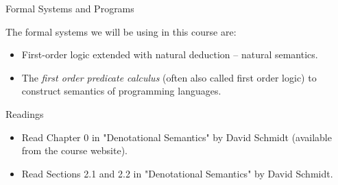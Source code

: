 \documentclass{beamer}
\begin{document}
\begin{frame}{Formal Systems and Programs}

The formal systems we will be using in this course are:
\begin{itemize}
\item First-order logic extended with natural deduction -- natural semantics.
\item The {\em first order predicate calculus} (often also called first order logic) to construct semantics of programming languages.
\end{itemize}
\end{frame}

\begin{frame}{Readings}
\begin{itemize}
\item Read Chapter 0 in "Denotational Semantics" by David Schmidt (available from the course website).
\item Read Sections 2.1 and 2.2 in "Denotational Semantics" by David Schmidt.
\end{itemize}
\end{frame}
\end{document}
